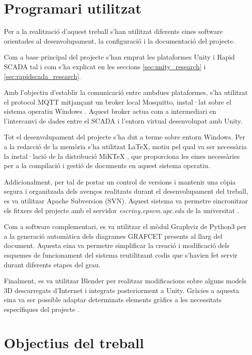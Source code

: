\documentclass[12pt,a4paper]{report}
\begin{document}
\section{Programari utilitzat}

Per a la realització d'aquest treball s'han utilitzat diferents eines software orientades al desenvolupament, la configuració i la documentació del projecte.

Com a base principal del projecte s'han emprat les plataformes Unity i Rapid SCADA tal i com s'ha explicat en les seccions  \ref{sec:unity_research} i \ref{sec:rapidscada_research}.

Amb l'objectiu d'establir la comunicació entre ambdues plataformes, s'ha utilitzat el protocol MQTT mitjançant un broker local Mosquitto, instal·lat sobre el sistema operatiu Windows \cite{mosquitto_download}. Aquest broker actua com a intermediari en l'intercanvi de dades entre el SCADA i l'entorn virtual desenvolupat amb Unity.

Tot el desenvolupament del projecte s'ha dut a terme sobre entorn Windows. Per a la redacció de la memòria s'ha utilitzat \LaTeX{}, motiu pel qual va ser necessària la instal·lació de la distribució MiKTeX \cite{Latex}, que proporciona les eines necessàries per a la compilació i gestió de documents en aquest sistema operatiu.

Addicionalment, per tal de portar un control de versions i mantenir una còpia segura i organitzada dels avenços realitzats durant el desenvolupament del treball, es va utilitzar Apache Subversion (SVN). Aquest sistema va permetre sincronitzar els fitxers del projecte amb el servidor \textit{escriny.epsem.upc.edu} de la universitat \cite{Apache}.

Com a software complementari, es va utilitzar el mòdul Graphviz de Python3 per a la generació automàtica dels diagrames GRAFCET presents al llarg del document. Aquesta eina va permetre simplificar la creació i modificació dels esquemes de funcionament del sistema reutilitzant codis que s'havien fet servir durant diferents etapes del grau.

Finalment, es va utilitzar Blender per realitzar modificacions sobre alguns models 3D descarregats d'Internet i integrats posteriorment a Unity. Gràcies a aquesta eina va ser possible adaptar determinats elements gràfics a les necessitats específiques del projecte \cite{blender_download}.



\section{Objectius del treball}
\end{document}
